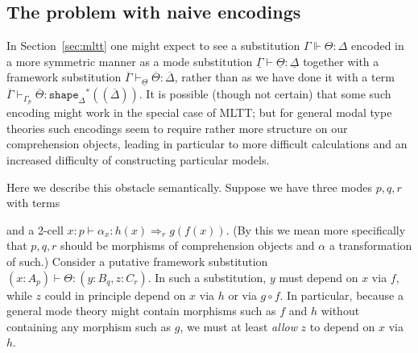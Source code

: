 \documentclass[10pt]{article}
\theoremstyle{definition}
\newcommand{\yields}{\vdash}
\newcommand{\tcell}{\Rightarrow}
\newcommand\St[2]{\ensuremath{{#1}^*(#2)}}
\newcommand\TermTwoT[5]{\ensuremath{#1 \vdash {#2} : #3 \tcell_{#5} #4}}
\newcommand\ctxtuple[1]{(#1)}
\newcommand{\modeof}[1]{{#1}_p}
\newcommand{\tshape}[1]{\ensuremath{\mathtt{shape}_{#1}}}
\newcommand{\qyields}{\Vdash}
\newcommand{\upstairs}[1]{\overline{#1}}
\newcommand{\downstairs}[1]{\underline{#1}}
\begin{document}
\subsection{The problem with naive encodings}
\label{sec:naive}

In Section~\ref{sec:mltt} one might expect to see a substitution $\Gamma \qyields \Theta : \Delta$ encoded in a more symmetric manner as a mode substitution $\downstairs{\Gamma} \yields \downstairs{\Theta} : \downstairs{\Delta}$ together with a framework substitution $\upstairs{\Gamma} \yields_{\downstairs{\Theta}} \upstairs{\Theta} : \upstairs{\Delta}$, rather than as we have done it with a term $\upstairs{\Gamma} \yields_{\modeof{\Gamma}} \upstairs{\Theta} : \St{\tshape{\Delta}}{\ctxtuple{\upstairs{\Delta}}}$.
It is possible (though not certain) that some such encoding might work in the special case of MLTT; but for general modal type theories such encodings seem to require rather more structure on our comprehension objects, leading in particular to more difficult calculations and an increased difficulty of constructing particular models.

Here we describe this obstacle semantically.
Suppose we have three modes $p,q,r$ with terms
and a 2-cell $\TermTwoT{x:p}{\alpha_x}{h(x)}{g(f(x))}{r}$.
(By this we mean more specifically that $p,q,r$ should be morphisms of comprehension objects and $\alpha$ a transformation of such.)
Consider a putative framework substitution $(x:A_p) \yields \Theta : (y:B_q, z:C_r)$.
In such a substitution, $y$ must depend on $x$ via $f$, while $z$ could in principle depend on $x$ via $h$ or via $g\circ f$.
In particular, because a general mode theory might contain morphisms such as $f$ and $h$ without containing any morphism such as $g$, we must at least \emph{allow} $z$ to depend on $x$ via $h$.
\end{document}
